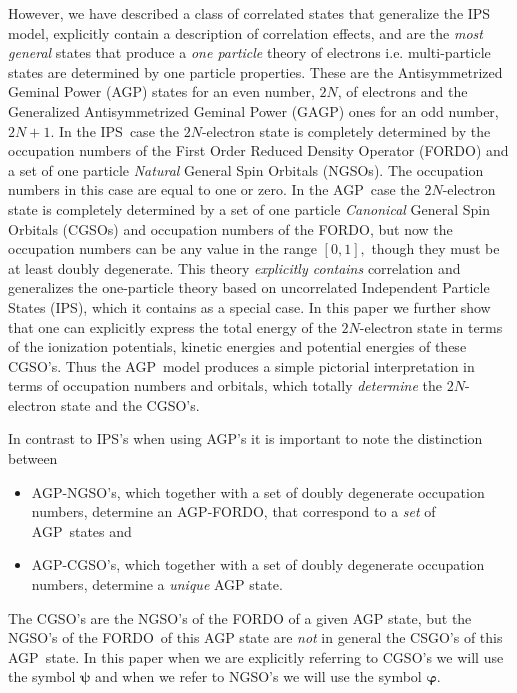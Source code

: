 \documentclass[titlepage]{article}%
\begin{document}
However, we have described \cite{Weiner&ortiz04} a class of correlated states
that generalize the IPS model, explicitly contain a description of correlation
effects, and are the \emph{most general} states that produce a \emph{one
particle} theory of electrons i.e. multi-particle states are determined by one
particle properties. These are the Antisymmetrized Geminal Power (AGP) states
for an even number, $2N$, of electrons and the Generalized Antisymmetrized
Geminal Power (GAGP) ones for an odd number, $2N+1$. In the IPS\ case the
$2N$-electron state is completely determined by the occupation numbers of the
First Order Reduced Density Operator (FORDO) and a set of one particle
\emph{Natural }General Spin Orbitals (NGSOs). The occupation numbers in this
case are equal to one or zero. In the AGP\ case the $2N$-electron state is
completely determined by a set of one particle \emph{Canonical }General Spin
Orbitals (CGSOs) and occupation numbers of the FORDO, but now the occupation
numbers can be any value in the range $\left[  0,1\right]  ,$ though they must
be at least doubly degenerate. This theory \emph{explicitly contains}
correlation and generalizes the one-particle theory based on uncorrelated
Independent Particle States (IPS), which it contains as a special case. In
this paper we further show that one can explicitly express the total energy of
the $2N$-electron state in terms of the ionization potentials, kinetic
energies and potential energies of these CGSO's. Thus the AGP\ model produces
a simple pictorial interpretation in terms of occupation numbers and orbitals,
which totally \emph{determine} the $2N$-electron state and the CGSO's.

In contrast to IPS's when using AGP's it is important to note the distinction between

\begin{itemize}
\item AGP-NGSO's, which together with a set of doubly degenerate occupation
numbers, determine an AGP-FORDO, that correspond to a \emph{set }of
AGP\ states and

\item AGP-CGSO's, which together with a set of doubly degenerate occupation
numbers, determine a \emph{unique} AGP state.
\end{itemize}

The CGSO's are the NGSO's of the FORDO of a given AGP state, but the NGSO's of
the FORDO\ of this AGP state are \emph{not }in general the CSGO's of this
AGP\ state. In this paper when we are explicitly referring to CGSO's we will
use the symbol $\bm{\psi}$ and when we refer to NGSO's we will use the symbol
$\bm{\varphi.}$
\end{document}
